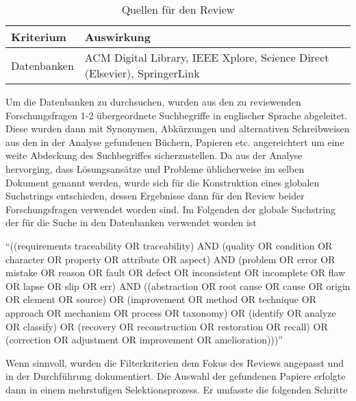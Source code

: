 \begin{table}[!ht]
\renewcommand{\arraystretch}{1.3}
\centering
\begin{threeparttable}
\begin{tabularx}{\columnwidth}{@{}lX@{}}
\toprule
Kriterium & Auswirkung \\ \midrule
Datenbanken & ACM Digital Library, IEEE Xplore, Science Direct (Elsevier), SpringerLink \\
\bottomrule
\end{tabularx}
\medskip
\end{threeparttable}
\caption{Quellen für den Review}
\label{tab:quellen_review}
\end{table}

Um die Datenbanken zu durchsuchen, wurden aus den zu reviewenden Forschungsfragen 1-2 übergeordnete Suchbegriffe in englischer Sprache abgeleitet. Diese wurden dann mit Synonymen, Abkürzungen und alternativen Schreibweisen aus den in der Analyse gefundenen Büchern, Papieren etc. angereichtert um eine weite Abdeckung des Suchbegriffes sicherzustellen. Da aus der Analyse hervorging, dass Lösungsansätze und Probleme üblicherweise im selben Dokument genannt werden, wurde sich für die Konstruktion eines globalen Suchstrings entschieden, dessen Ergebnisse dann für den Review beider Forschungsfragen verwendet worden sind. Im Folgenden der globale Suchstring der für die Suche in den Datenbanken verwendet worden ist

\enquote{((requirements traceability OR traceability) AND (quality OR condition OR character OR property OR attribute OR aspect) AND (problem OR error OR mistake OR reason OR fault OR defect OR inconsistent OR incomplete OR flaw OR lapse OR slip OR err) AND ((abstraction OR root cause OR cause OR origin OR element OR source) OR (improvement OR method OR technique OR approach OR mechanism OR process OR taxonomy) OR (identify OR analyze OR classify) OR (recovery OR reconstruction OR restoration OR recall) OR (correction OR adjustment OR improvement OR amelioration)))}

Wenn sinnvoll, wurden die Filterkriterien dem Fokus des Reviews angepasst und in der Durchführung dokumentiert. Die Auswahl der gefundenen Papiere erfolgte dann in einem mehrstufigen Selektionsprozess. Er umfasste die folgenden Schritte

